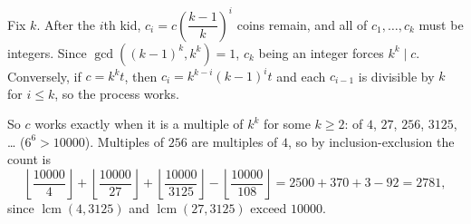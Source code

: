 Fix $k$. After the $i$th kid, $c_i=c\left(\dfrac{k-1}{k}\right)^i$ coins remain, and all of $c_1,\dots,c_k$ must be integers. Since $\gcd\left((k-1)^k,k^k\right)=1$, $c_k$ being an integer forces $k^k\mid c$. Conversely, if $c=k^kt$, then $c_i=k^{k-i}(k-1)^it$ and each $c_{i-1}$ is divisible by $k$ for $i\le k$, so the process works.

So $c$ works exactly when it is a multiple of $k^k$ for some $k\ge2$: of $4$, $27$, $256$, $3125$, \dots{} ($6^6>10000$). Multiples of $256$ are multiples of $4$, so by inclusion-exclusion the count is
\[\left\lfloor\dfrac{10000}{4}\right\rfloor+\left\lfloor\dfrac{10000}{27}\right\rfloor+\left\lfloor\dfrac{10000}{3125}\right\rfloor-\left\lfloor\dfrac{10000}{108}\right\rfloor=2500+370+3-92=\boxed{2781},\]
since $\operatorname{lcm}(4,3125)$ and $\operatorname{lcm}(27,3125)$ exceed $10000$.
